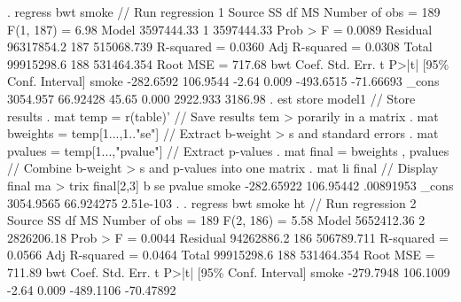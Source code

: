 . regress bwt smoke                                                               // Run regression 1
{\smallskip}
      Source {\VBAR}       SS           df       MS      Number of obs   =       189
   F(1, 187)       =      6.98
       Model {\VBAR}  3597444.33         1  3597444.33   Prob > F        =    0.0089
    Residual {\VBAR}  96317854.2       187  515068.739   R-squared       =    0.0360
   Adj R-squared   =    0.0308
       Total {\VBAR}  99915298.6       188  531464.354   Root MSE        =    717.68
{\smallskip}
         bwt {\VBAR}      Coef.   Std. Err.      t    P>|t|     [95\% Conf. Interval]
       smoke {\VBAR}  -282.6592   106.9544    -2.64   0.009    -493.6515   -71.66693
       _cons {\VBAR}   3054.957   66.92428    45.65   0.000     2922.933     3186.98
{\smallskip}
. est store model1                                                                // Store results
{\smallskip}
. mat temp = r(table)'                                                            // Save results tem
> porarily in a matrix
{\smallskip}
. mat bweights = temp[1...,1.."se"]                                               // Extract b-weight
> s and standard errors
{\smallskip}
. mat pvalues = temp[1...,"pvalue"]                                               // Extract p-values
{\smallskip}
. mat final = bweights , pvalues                                                  // Combine b-weight
> s and p-values into one matrix
{\smallskip}
. mat li final                                                                    // Display final ma
> trix
{\smallskip}
final[2,3]
                b          se      pvalue
smoke  -282.65922   106.95442   .00891953
_cons   3054.9565   66.924275   2.51e-103
{\smallskip}
. 
. regress bwt smoke ht                                                            // Run regression 2
{\smallskip}
      Source {\VBAR}       SS           df       MS      Number of obs   =       189
   F(2, 186)       =      5.58
       Model {\VBAR}  5652412.36         2  2826206.18   Prob > F        =    0.0044
    Residual {\VBAR}  94262886.2       186  506789.711   R-squared       =    0.0566
   Adj R-squared   =    0.0464
       Total {\VBAR}  99915298.6       188  531464.354   Root MSE        =    711.89
{\smallskip}
         bwt {\VBAR}      Coef.   Std. Err.      t    P>|t|     [95\% Conf. Interval]
       smoke {\VBAR}  -279.7948   106.1009    -2.64   0.009    -489.1106   -70.47892

